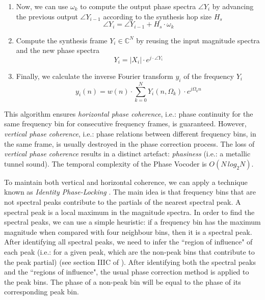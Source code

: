 \documentclass{sig-alternate}
\begin{document}
\begin{sloppypar}
\begin{enumerate}
	\item Now, we can use $\omega_k$ to compute the output phase spectra $\angle Y_i$ by advancing the previous output $\angle Y_{i-1}$ according to the synthesis hop size $H_s$
\begin{equation}
\angle Y_i = \angle Y_{i-1} + H_s \cdot \omega_k
\end{equation}

	\item Compute the synthesis frame $Y_i \in \mathbb{C}^N$ by reusing the input magnitude spectra and the new phase spectra
\begin{equation}
Y_i = |X_i| \cdot e^{j \cdot \angle Y_i}
\end{equation}

	\item Finally, we calculate the inverse Fourier transform $y_i$ of the frequency  $Y_i$
\begin{equation}
y_{i}(n) = w(n) \cdot \sum_{k=0}^{N} Y_i(n,\Omega_k) \cdot e^{j\Omega_{k}n}
\end{equation}
	

\end{enumerate}
\end{sloppypar}

This algorithm ensures \textit{horizontal phase coherence}, i.e.: phase continuity for the same frequency bin for consecutive frequency frames, is guaranteed. However, \textit{vertical phase coherence}, i.e.: phase relations between different frequency bins, in the same frame, is usually destroyed in the phase correction process. The loss of \textit{vertical phase coherence} results in a distinct artefact: \textit{phasiness} (i.e.: a metallic tunnel sound). The temporal complexity of the Phase Vocoder is $O(N\,log_{2}N)$.

To maintain both vertical and horizontal coherence, we can apply a technique known as \textit{Identity Phase-Locking} \cite{phasevocoder:identityphaselock}. The main idea is that frequency bins that are not spectral peaks contribute to the partials of the nearest spectral peak. A spectral peak is a local maximum in the magnitude spectra. In order to find the spectral peaks, we can use a simple heuristic: if a frequency bin has the maximum magnitude when compared with four neighbour bins,  then it is a spectral peak. After identifying all spectral peaks, we need to infer the ``region of influence" of each peak (i.e.: for a given peak, which are the non-peak bins that contribute to the peak partial) (see section IIIC of \cite{phasevocoder:identityphaselock}). After identifying both the spectral peaks and the ``regions of influence", the usual phase correction method is applied to the peak bins. The phase of a non-peak bin will be equal to the phase of its corresponding peak bin.
\end{document}
